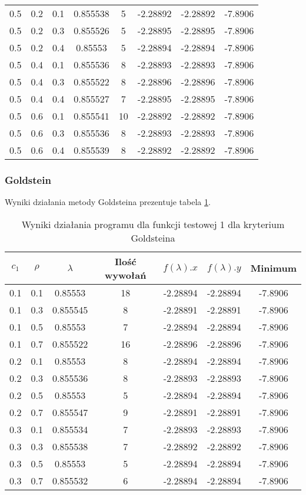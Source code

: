 \documentclass{classrep}
\begin{document}
\begin{table}
\begin{tabular}{|c|c|c|c|c|c|c|c|}
    0.5 & 0.2 & 0.1 & 0.855538 & 5 & -2.28892 & -2.28892 & -7.8906 \\
    0.5 & 0.2 & 0.3 & 0.855526 & 5 & -2.28895 & -2.28895 & -7.8906 \\
    0.5 & 0.2 & 0.4 & 0.85553 & 5 & -2.28894 & -2.28894 & -7.8906 \\
    0.5 & 0.4 & 0.1 & 0.855536 & 8 & -2.28893 & -2.28893 & -7.8906 \\
    0.5 & 0.4 & 0.3 & 0.855522 & 8 & -2.28896 & -2.28896 & -7.8906 \\
    0.5 & 0.4 & 0.4 & 0.855527 & 7 & -2.28895 & -2.28895 & -7.8906 \\
    0.5 & 0.6 & 0.1 & 0.855541 & 10 & -2.28892 & -2.28892 & -7.8906 \\
    0.5 & 0.6 & 0.3 & 0.855536 & 8 & -2.28893 & -2.28893 & -7.8906 \\
    0.5 & 0.6 & 0.4 & 0.855539 & 8 & -2.28892 & -2.28892 & -7.8906 \\
    \hline
  \end{tabular}
\end{table}

\subsubsection{Goldstein}

Wyniki działania metody Goldsteina prezentuje tabela \ref{goldstein1}.

\begin{table}
  \centering
  \caption{Wyniki działania programu dla funkcji testowej 1 dla kryterium Goldsteina}
  \label{goldstein1}
  \begin{tabular}{|c|c|c|c|c|c|c|}
    \hline
    $c_1$ & $\rho$ & $\lambda$ & Ilość wywołań & $f(\lambda).x$ & $f(\lambda).y$ & Minimum \\
    \hline
    0.1 & 0.1 & 0.85553 & 18 & -2.28894 & -2.28894 & -7.8906 \\
    0.1 & 0.3 & 0.855545 & 8 & -2.28891 & -2.28891 & -7.8906 \\
    0.1 & 0.5 & 0.85553 & 7 & -2.28894 & -2.28894 & -7.8906 \\
    0.1 & 0.7 & 0.855522 & 16 & -2.28896 & -2.28896 & -7.8906 \\
    0.2 & 0.1 & 0.85553 & 8 & -2.28894 & -2.28894 & -7.8906 \\
    0.2 & 0.3 & 0.855536 & 8 & -2.28893 & -2.28893 & -7.8906 \\
    0.2 & 0.5 & 0.85553 & 5 & -2.28894 & -2.28894 & -7.8906 \\
    0.2 & 0.7 & 0.855547 & 9 & -2.28891 & -2.28891 & -7.8906 \\
    0.3 & 0.1 & 0.855534 & 7 & -2.28893 & -2.28893 & -7.8906 \\
    0.3 & 0.3 & 0.855538 & 7 & -2.28892 & -2.28892 & -7.8906 \\
    0.3 & 0.5 & 0.85553 & 5 & -2.28894 & -2.28894 & -7.8906 \\
    0.3 & 0.7 & 0.855532 & 6 & -2.28894 & -2.28894 & -7.8906 \\
    \hline
  \end{tabular}
\end{table}
\end{document}

